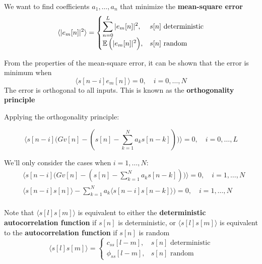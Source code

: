 \documentclass[10pt]{beamer}
\begin{document}
\begin{frame}
We want to find coefficients $a_1, \ldots, a_n$ that minimize the \textbf{mean-square error}
\begin{equation*}
\langle |e_m[n]|^2 \rangle = \begin{cases}
\displaystyle\sum_{n =0}^{L} |e_m[n]|^2, & \text{$s[n]$ deterministic} \\
\operatorname{\mathbb{E}}\Big(|e_m[n]|^2\Big), & \text{$s[n]$ random}
\end{cases}
\end{equation*}

From the properties of the mean-square error, it can be shown that the error is minimum when
\begin{equation*}
\langle s[n-i]e_m[n] \rangle = 0,  \quad i = 0, \ldots, N
\end{equation*}
The error is orthogonal to all inputs. This is known as the \textbf{orthogonality principle}
\end{frame}

%
\begin{frame}
Applying the orthogonality principle:

\begin{equation*}
\Big\langle s[n-i] \Big(Gv[n] - (s[n] - \sum_{k = 1}^N a_ks[n-k])\Big) \Big\rangle  = 0, \quad i = 0, \ldots, L
\end{equation*}

We'll only consider the cases when $i = 1, \ldots, N$:
\begin{align*}
	&\Big\langle s[n-i] \Big(Gv[n] - (s[n] - \sum_{k = 1}^N a_ks[n-k])\Big) \Big\rangle  = 0, \quad i = 1, \ldots, N \\
	&\langle s[n-i]s[n]\rangle - \sum_{k = 1}^N a_k\langle s[n-i]s[n-k]\rangle)  = 0, \quad i = 1, \ldots, N \tag{from causality $\langle s[n-i]v[n]\rangle = 0$}\\
\end{align*}

Note that $\langle s[l]s[m]\rangle$ is equivalent to either the \textbf{deterministic autocorrelation function} if $s[n]$ is deterministic, or $\langle s[l]s[m]\rangle$  is equivalent to the \textbf{autocorrelation function} if $s[n]$ is random
\begin{equation*}
	\langle s[l]s[m]\rangle = \begin{cases}
	c_{ss}[l-m], & \text{$s[n]$ deterministic} \\
	\phi_{ss}[l-m], & \text{$s[n]$ random}
	\end{cases}
\end{equation*}

\end{frame}
\end{document}
